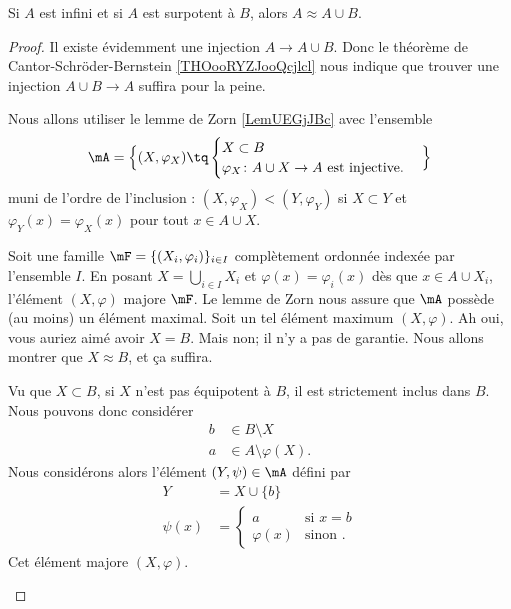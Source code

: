 \begin{lemma}       \label{LEMooXMVDooIWLWis}
	Si \( A\) est infini et si \( A\) est surpotent à \( B\), alors \( A\approx A\cup B\).
\end{lemma}

\begin{proof}
	Il existe évidemment une injection \( A\to A\cup B\). Donc le théorème de Cantor-Schröder-Bernstein \ref{THOooRYZJooQcjlcl} nous indique que trouver une injection \( A\cup B\to A\) suffira pour la peine.

	Nous allons utiliser le lemme de Zorn \ref{LemUEGjJBc} avec l'ensemble
	\begin{equation}
		\mA=\Big\{  (X,\varphi_X)  \tq
		\begin{cases}
			X\subset B \\
			\varphi_X\colon A\cup X\to A\text{ est injective.}
		\end{cases}
		\Big\}
	\end{equation}
	muni de l'ordre de l'inclusion : \( (X,\varphi_X)<(Y,\varphi_Y)\) si \( X\subset Y\) et \( \varphi_Y(x)=\varphi_X(x)\) pour tout \( x\in A\cup X\).

	\begin{subproof}
		Soit une famille \( \mF=\{ (X_i,\varphi_i) \}_{i\in I}\) complètement ordonnée indexée par l'ensemble \( I\). En posant \( X=\bigcup_{i\in I}X_i\) et \( \varphi(x)=\varphi_i(x)\) dès que \( x\in A\cup X_i\), l'élément \( (X,\varphi)\) majore \( \mF\).
		\spitem[Un maximum]
		Le lemme de Zorn nous assure que \( \mA\) possède (au moins) un élément maximal. Soit un tel élément maximum \( (X,\varphi)\).
		\spitem[\( X\approx B\)]
		Ah oui, vous auriez aimé avoir \( X=B\). Mais non; il n'y a pas de garantie. Nous allons montrer que \( X\approx B\), et ça suffira.

		Vu que \( X\subset B\), si \( X\) n'est pas équipotent à \( B\), il est strictement inclus dans \( B\). Nous pouvons donc considérer
		\begin{subequations}
			\begin{align}
				b & \in B\setminus X           \\
				a & \in A\setminus \varphi(X).
			\end{align}
		\end{subequations}
		Nous considérons alors l'élément \( (Y,\psi)\in \mA\) défini par
		\begin{subequations}
			\begin{align}
				Y       & =X\cup\{ b \}                \\
				\psi(x) & =\begin{cases}
					           a          & \text{si } x=b \\
					           \varphi(x) & \text{sinon }.
				           \end{cases}
			\end{align}
		\end{subequations}
		Cet élément majore \( (X,\varphi)\).


\end{subproof}
\end{proof}
